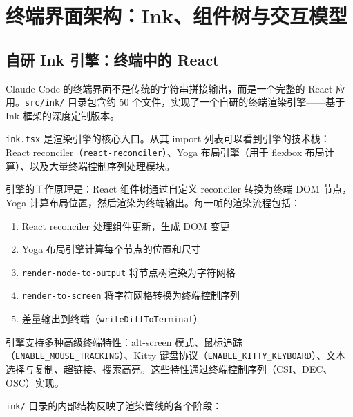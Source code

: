 \chapter{终端界面架构：Ink、组件树与交互模型}

\section{自研 Ink 引擎：终端中的 React}

Claude Code 的终端界面不是传统的字符串拼接输出，而是一个完整的 React 应用。\texttt{src/ink/} 目录包含约 50 个文件，实现了一个自研的终端渲染引擎——基于 Ink 框架的深度定制版本。

\texttt{ink.tsx} 是渲染引擎的核心入口。从其 import 列表可以看到引擎的技术栈：React reconciler（\texttt{react-reconciler}）、Yoga 布局引擎（用于 flexbox 布局计算）、以及大量终端控制序列处理模块。

引擎的工作原理是：React 组件树通过自定义 reconciler 转换为终端 DOM 节点，Yoga 计算布局位置，然后渲染为终端输出。每一帧的渲染流程包括：

\begin{enumerate}
  \item React reconciler 处理组件更新，生成 DOM 变更
  \item Yoga 布局引擎计算每个节点的位置和尺寸
  \item \texttt{render-node-to-output} 将节点树渲染为字符网格
  \item \texttt{render-to-screen} 将字符网格转换为终端控制序列
  \item 差量输出到终端（\texttt{writeDiffToTerminal}）
\end{enumerate}

引擎支持多种高级终端特性：alt-screen 模式、鼠标追踪（\texttt{ENABLE\_MOUSE\_TRACKING}）、Kitty 键盘协议（\texttt{ENABLE\_KITTY\_KEYBOARD}）、文本选择与复制、超链接、搜索高亮。这些特性通过终端控制序列（CSI、DEC、OSC）实现。

\texttt{ink/} 目录的内部结构反映了渲染管线的各个阶段：


